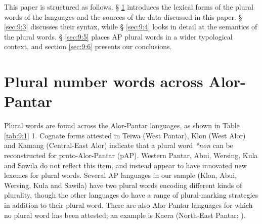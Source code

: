 This paper is structured as follows. {\S} \ref{sec:9:2} introduces the lexical forms of the plural words of the languages and the sources of the data discussed in this paper. {\S} \ref{sec:9:3} discusses their syntax, while {\S} \ref{sec:9:4} looks in detail at the semantics of the plural words. {\S} \ref{sec:9:5} places AP plural words in a wider typological context, and section \ref{sec:9:6} presents our conclusions.

\section{Plural number words across Alor-Pantar}  %
\label{sec:9:2}
Plural words are found across the Alor-Pantar languages, as shown in Table \ref{tab:9:1} 1. Cognate forms attested in Teiwa (West Pantar), Klon (West Alor) and Kamang (Central-East Alor) indicate that a plural word \textit{*non} can be reconstructed for proto-Alor-Pantar (pAP). Western Pantar, Abui, Wersing, Kula and Sawila do not reflect this item, and instead appear to have innovated new lexemes for plural words. Several AP languages in our sample (Klon, Abui, Wersing, Kula and Sawila) have two plural words encoding different kinds of plurality, though the other languages do have a range of plural-marking strategies in addition to their plural word. There are also Alor-Pantar languages for which no plural word has been attested; an example is Kaera (North-East Pantar; \citealt{Klamertakaera}).



